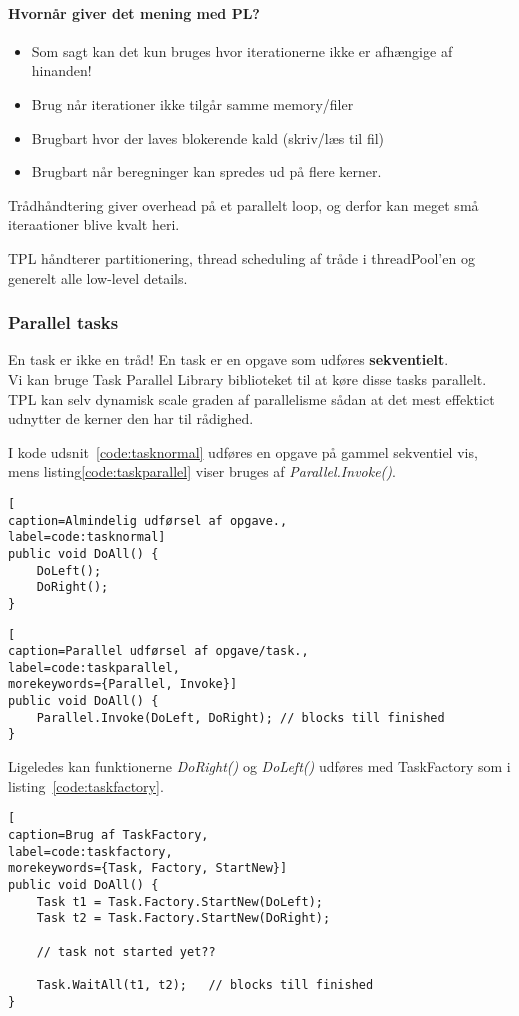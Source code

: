 \paragraph{Hvornår giver det mening med PL?}
\begin{itemize}
	\item Som sagt kan det kun bruges hvor iterationerne ikke er afhængige af hinanden!
	\item Brug når iterationer ikke tilgår samme memory/filer
	\item Brugbart hvor der laves blokerende kald (skriv/læs til fil)
	\item Brugbart når beregninger kan spredes ud på flere kerner.
\end{itemize}

Trådhåndtering giver overhead på et parallelt loop, og derfor kan meget små iteraationer blive kvalt heri.

TPL håndterer partitionering, thread scheduling af tråde i threadPool'en og generelt alle low-level details.

\subsubsection{Parallel tasks}

En task er ikke en tråd! En task er en opgave som udføres \textbf{sekventielt}.\\

Vi kan bruge Task Parallel Library biblioteket til at køre disse tasks parallelt. TPL kan selv dynamisk scale graden af parallelisme sådan at det mest effektict udnytter de kerner den har til rådighed.

I kode udsnit~\ref{code:tasknormal} udføres en opgave på gammel sekventiel vis, mens listing\ref{code:taskparallel} viser bruges af \textit{Parallel.Invoke()}.

\begin{lstlisting}[
caption=Almindelig udførsel af opgave.,
label=code:tasknormal]
public void DoAll() {
	DoLeft();
	DoRight();
}
\end{lstlisting}

\begin{lstlisting}[
caption=Parallel udførsel af opgave/task.,
label=code:taskparallel,
morekeywords={Parallel, Invoke}]
public void DoAll() {
	Parallel.Invoke(DoLeft, DoRight); // blocks till finished
}
\end{lstlisting}

Ligeledes kan funktionerne \textit{DoRight()} og \textit{DoLeft()} udføres med TaskFactory som i listing~\ref{code:taskfactory}.

\begin{minipage}{\linewidth}
\begin{lstlisting}[
caption=Brug af TaskFactory,
label=code:taskfactory,
morekeywords={Task, Factory, StartNew}]
public void DoAll() {
	Task t1 = Task.Factory.StartNew(DoLeft);
	Task t2 = Task.Factory.StartNew(DoRight);
	
	// task not started yet??
	
	Task.WaitAll(t1, t2);	// blocks till finished
}
\end{lstlisting}
\end{minipage}

